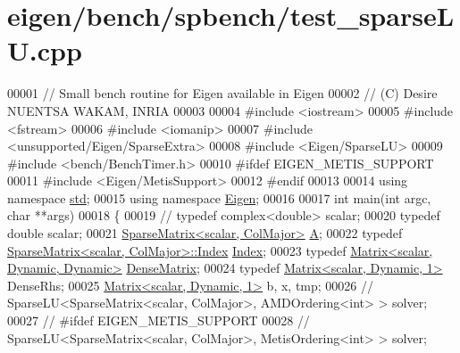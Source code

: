 \hypertarget{eigen_2bench_2spbench_2test__sparse_l_u_8cpp_source}{}\section{eigen/bench/spbench/test\+\_\+sparse\+LU.cpp}
\label{eigen_2bench_2spbench_2test__sparse_l_u_8cpp_source}

\begin{DoxyCode}
00001 \textcolor{comment}{// Small bench routine for Eigen available in Eigen}
00002 \textcolor{comment}{// (C) Desire NUENTSA WAKAM, INRIA}
00003 
00004 \textcolor{preprocessor}{#include <iostream>}
00005 \textcolor{preprocessor}{#include <fstream>}
00006 \textcolor{preprocessor}{#include <iomanip>}
00007 \textcolor{preprocessor}{#include <unsupported/Eigen/SparseExtra>}
00008 \textcolor{preprocessor}{#include <Eigen/SparseLU>}
00009 \textcolor{preprocessor}{#include <bench/BenchTimer.h>}
00010 \textcolor{preprocessor}{#ifdef EIGEN\_METIS\_SUPPORT}
00011 \textcolor{preprocessor}{#include <Eigen/MetisSupport>}
00012 \textcolor{preprocessor}{#endif}
00013 
00014 \textcolor{keyword}{using namespace }\hyperlink{namespacestd}{std};
00015 \textcolor{keyword}{using namespace }\hyperlink{namespace_eigen}{Eigen};
00016 
00017 \textcolor{keywordtype}{int} main(\textcolor{keywordtype}{int} argc, \textcolor{keywordtype}{char} **args)
00018 \{
00019 \textcolor{comment}{//   typedef complex<double> scalar; }
00020   \textcolor{keyword}{typedef} \textcolor{keywordtype}{double} scalar; 
00021   \hyperlink{group___sparse_core___module_class_eigen_1_1_sparse_matrix}{SparseMatrix<scalar, ColMajor>} \hyperlink{group___core___module_class_eigen_1_1_matrix}{A}; 
00022   \textcolor{keyword}{typedef} \hyperlink{group___sparse_core___module_class_eigen_1_1_sparse_matrix}{SparseMatrix<scalar, ColMajor>::Index} 
      \hyperlink{namespace_eigen_a62e77e0933482dafde8fe197d9a2cfde}{Index};
00023   \textcolor{keyword}{typedef} \hyperlink{group___core___module_class_eigen_1_1_matrix}{Matrix<scalar, Dynamic, Dynamic>} 
      \hyperlink{group___core___module}{DenseMatrix};
00024   \textcolor{keyword}{typedef} \hyperlink{group___core___module_class_eigen_1_1_matrix}{Matrix<scalar, Dynamic, 1>} DenseRhs;
00025   \hyperlink{group___core___module_class_eigen_1_1_matrix}{Matrix<scalar, Dynamic, 1>} b, x, tmp;
00026 \textcolor{comment}{//   SparseLU<SparseMatrix<scalar, ColMajor>, AMDOrdering<int> >   solver;}
00027 \textcolor{comment}{// #ifdef EIGEN\_METIS\_SUPPORT}
00028 \textcolor{comment}{//   SparseLU<SparseMatrix<scalar, ColMajor>, MetisOrdering<int> > solver; }

\end{DoxyCode}
